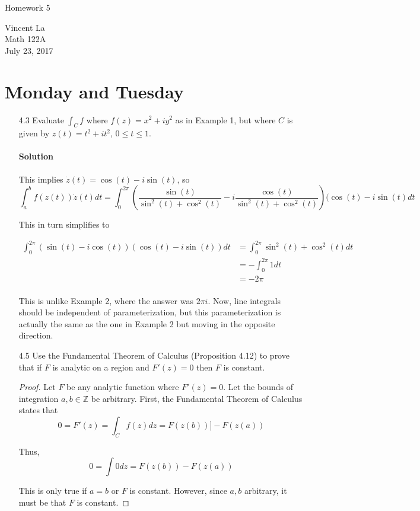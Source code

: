 \documentclass[11pt]{article}
\title{ }
\begin{document}
	\begin{center}	%
		\Large{Homework 5}	%
	\end{center}
	\begin{center}
		Vincent La \\
		Math 122A \\
		July 23, 2017
	\end{center}
	
	\section{Monday and Tuesday}
	\begin{enumerate}
		\item[4.3] Evaluate $\int_C f$ where $f(z) = x^2 + iy^2$ as in Example 1, but where $C$ is given by $z(t) = t^2 + it^2$, $0 \leq t \leq 1$.
		
		\paragraph{Solution} This implies $\dot{z}(t) = \cos(t) - i\sin(t)$, so
		\[\int^b_a f(z(t))\dot{z}(t) dt = \int^{2\pi}_0 (\frac{\sin(t)}{\sin^2(t) + \cos^2(t)} - i\frac{\cos(t)}{\sin^2(t)+\cos^2(t)})(\cos(t) - i\sin(t) dt\]
		
		This in turn simplifies to
		
		\[\begin{aligned}
		\int^{2\pi}_{0} (\sin(t) - i\cos(t))(\cos(t) - i\sin(t)) dt &=
		\int^{2\pi}_{0} \sin^2(t) + \cos^2(t) dt \\
		&= -\int^{2\pi}_{0} 1 dt \\
		&= -2\pi \\
		\end{aligned}\]
		
		This is unlike Example 2, where the answer was $2\pi i$. Now, line integrals should be independent of parameterization, but this parameterization is actually the same as the one in Example 2 but moving in the opposite direction.
		
		\item[4.5] Use the Fundamental Theorem of Calculus (Proposition 4.12) to prove that if $F$ is analytic on a region and $F'(z) = 0$ then $F$ is constant.
		
		\begin{proof}
			Let $F$ be any analytic function where $F'(z) = 0$. Let the bounds of integration $a, b \in \mathbb{Z}$ be arbitrary. First, the Fundamental Theorem of Calculus states that
			\[0 = F'(z) = \int_C f(z) dz = F(z(b))] - F(z(a)) \]
			
			Thus,
			\[0 = \int 0 dz = F(z(b)) - F(z(a)) \]
			
			This is only true if $a = b$ or $F$ is constant. However, since $a, b$ arbitrary, it must be that $F$ is constant.
		\end{proof}
	\end{enumerate}
	
\end{document}
